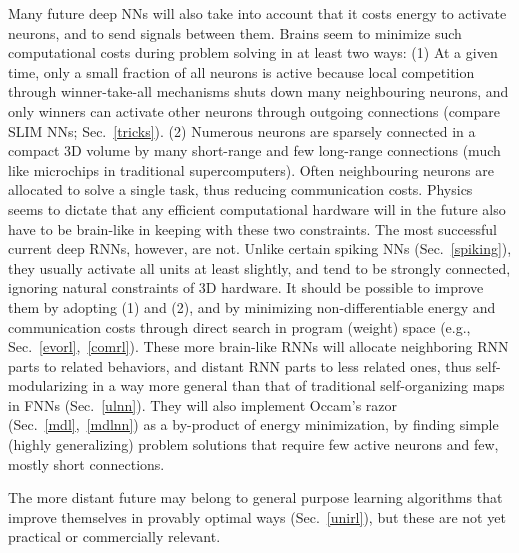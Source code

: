 \documentclass[letterpaper]{article}
\begin{document}
\begin{CJK*}{UTF8}{gbsn}
Many future deep NNs will also take into account that it costs energy
to activate neurons, and to send signals between them. Brains seem to
minimize such computational costs during problem solving in at least
two ways: (1) At a given time, only a small fraction of all neurons is
active because local competition through winner-take-all mechanisms
shuts down many neighbouring neurons, and only winners can activate
other neurons through outgoing connections (compare SLIM NNs;
Sec.~\ref{tricks}). (2) Numerous neurons are sparsely connected in a
compact 3D volume by many short-range and few long-range connections
(much like microchips in traditional supercomputers). Often
neighbouring neurons are allocated to solve a single task, thus
reducing communication costs.  Physics seems to dictate that any
efficient computational hardware will in the future also have to be
brain-like in keeping with these two constraints. The most successful
current deep RNNs, however, are not. Unlike certain spiking NNs
(Sec.~\ref{spiking}), they usually activate all units at least slightly,
and tend to be strongly connected, ignoring natural constraints of 3D
hardware. It should be possible to improve them by adopting (1) and
(2), and by minimizing non-differentiable energy and communication
costs through direct search in program (weight) space (e.g.,
Sec.~\ref{evorl},~\ref{comrl}).  These more brain-like RNNs will
allocate neighboring RNN parts to related behaviors, and distant RNN
parts to less related ones, thus self-modularizing in a way more
general than that of traditional self-organizing maps in FNNs
(Sec.~\ref{ulnn}). They will also implement Occam's razor
(Sec.~\ref{mdl},~\ref{mdlnn}) as a by-product of energy minimization,
by finding simple (highly generalizing) problem solutions that require
few active neurons and few, mostly short connections.

The more distant future may belong to general purpose learning
algorithms that improve themselves in provably optimal ways
(Sec.~\ref{unirl}), but these are not yet practical or commercially
relevant.
 





%
%
%
%
%
\end{CJK*}
\end{document}
